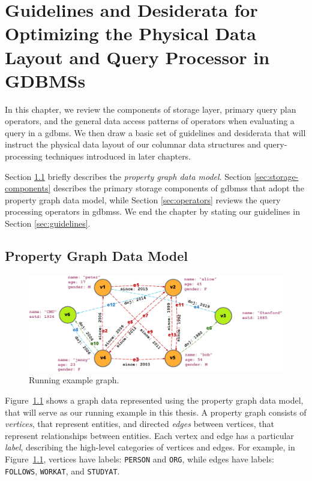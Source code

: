 \chapter{Guidelines and Desiderata for Optimizing the Physical Data Layout and Query Processor in GDBMSs}
\label{c:guidelines}

In this chapter, we review the components of storage layer, primary query plan operators, and the general data access patterns of operators when evaluating a query in a \gls{gdbms}. We then draw a basic set of guidelines and desiderata that will instruct the physical data layout of our columnar data structures and query-processing techniques introduced in later chapters.

Section \ref{sec:property-graph-data-model} briefly describes the \emph{property graph data model}. Section \ref{sec:storage-components} describes the primary storage components of \gls{gdbms}s that adopt the property graph data model, while Section \ref{sec:operators} reviews the query processing operators in \gls{gdbms}s. We end the chapter by stating our guidelines in Section \ref{sec:guidelines}.

\section{Property Graph Data Model}
\label{sec:property-graph-data-model}

\begin{figure}
	\includegraphics[scale=0.86]{img/property-graph}
	\vspace{-8pt}
	\caption{Running example graph.}
	\label{fig:runn}
	\vspace{-8pt}
\end{figure}

Figure~\ref{fig:runn} shows a graph data represented using the property graph data model, that will serve as our running example in this thesis. A property graph consists of \emph{vertices}, that represent entities, and directed \emph{edges} between vertices, that represent relationships between entities. Each vertex and edge has a particular \emph{label}, describing the high-level categories of vertices and edges. For example, in Figure~\ref{fig:runn}, vertices have labels: \texttt{PERSON} and \texttt{ORG}, while edges have labels: \texttt{FOLLOWS}, \texttt{WORKAT}, and \texttt{STUDYAT}.

